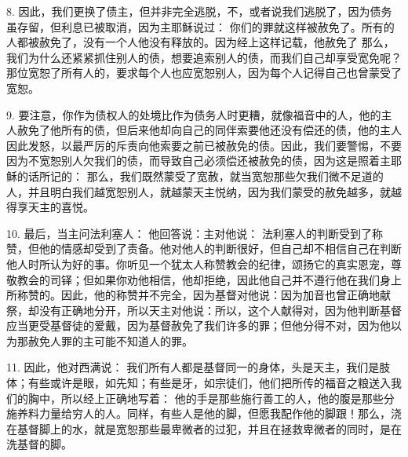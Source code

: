 8. 因此，我们更换了债主，但并非完全逃脱，不，或者说我们逃脱了，因为债务虽存留，但利息已被取消，因为主耶稣说过：  你们的罪就这样被赦免了。所有的人都被赦免了，没有一个人他没有释放的。因为经上这样记载，他赦免了   那么，我们为什么还紧紧抓住别人的债，想要追索别人的债，而我们自己却享受宽免呢？那位宽恕了所有人的，要求每个人也应宽恕别人，因为每个人记得自己也曾蒙受了宽恕。\par

9. 要注意，你作为债权人的处境比作为债务人时更糟，就像福音中的人，他的主人赦免了他所有的债，但后来他却向自己的同伴索要他还没有偿还的债，他的主人因此发怒，以最严厉的斥责向他索要之前已被赦免的债。因此，我们要警惕，不要因为不宽恕别人欠我们的债，而导致自己必须偿还被赦免的债，因为这是照着主耶稣的话所记的： 那么，我们既然蒙受了宽赦，就当宽恕那些欠我们微不足道的人，并且明白我们越宽恕别人，就越蒙天主悦纳，因为我们蒙受的赦免越多，就越得享天主的喜悦。\par

10. 最后，当主问法利塞人： 他回答说：主对他说： 法利塞人的判断受到了称赞，但他的情感却受到了责备。他对他人的判断很好，但自己却不相信自己在判断他人时所认为好的事。你听见一个犹太人称赞教会的纪律，颂扬它的真实恩宠，尊敬教会的司铎；但如果你劝他相信，他却拒绝，因此他自己并不遵行他在我们身上所称赞的。因此，他的称赞并不完全，因为基督对他说：因为加音也曾正确地献祭，却没有正确地分开，所以天主对他说：所以，这个人献得对，因为他判断基督应当更受基督徒的爱戴，因为基督赦免了我们许多的罪；但他分得不对，因为他以为那赦免人罪的主可能不知道人的罪。\par

11. 因此，他对西满说： 我们所有人都是基督同一的身体，头是天主，我们是肢体；有些或许是眼，如先知；有些是牙，如宗徒们，他们把所传的福音之粮送入我们的胸中，所以经上正确地写着： 他的手是那些施行善工的人，他的腹是那些分施养料力量给穷人的人。同样，有些人是他的脚，但愿我配作他的脚跟！那么，浇在基督脚上的水，就是宽恕那些最卑微者的过犯，并且在拯救卑微者的同时，是在洗基督的脚。\par

